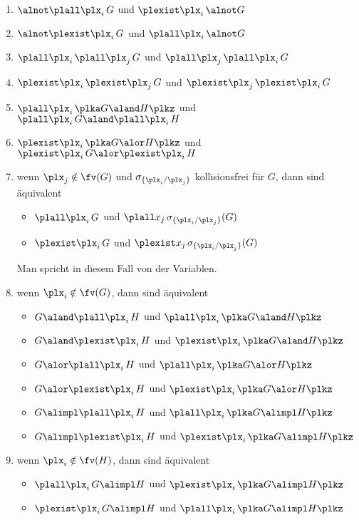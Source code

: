 \begin{enumerate}
\item $\alnot\plall\plx_i \,G$ und $\plexist\plx_i \,\alnot G$
\item $\alnot\plexist\plx_i \,G$ und $\plall\plx_i \,\alnot G$
\item $\plall\plx_i\,\plall\plx_j \,G$ und  $\plall\plx_j\,\plall\plx_i \,G$ 
\item $\plexist\plx_i\,\plexist\plx_j \,G$ und $\plexist\plx_j\,\plexist\plx_i \,G$
\item $\plall\plx_i\,\plka G \aland H\plkz$ und  $\plall\plx_i\, G \aland \plall\plx_i\,H$
\item $\plexist\plx_i\,\plka G \alor H\plkz$ und  $\plexist\plx_i\, G \alor \plexist\plx_i\,H$
\item wenn $\plx_j\notin\fv(G)$ und $\sigma_{\{\plx_i/\plx_j\}}$
  kollisionsfrei für $G$, dann sind äquivalent
  \begin{itemize}
  \item $\plall\plx_i \,G$ und $\plall x_j \, \sigma_{\{\plx_i/\plx_j\}}(G)$
  \item $\plexist\plx_i \,G$ und $\plexist x_j \, \sigma_{\{\plx_i/\plx_j\}}(G)$
  \end{itemize}
  Man spricht in diesem Fall von  der Variablen.
\item wenn $\plx_i\notin\fv(G)$, dann sind äquivalent
  \begin{itemize}
  \item $G\aland \plall \plx_i \, H$ und $\plall \plx_i \, \plka G\aland H\plkz$ 
  \item $G\aland \plexist \plx_i \, H$ und $\plexist \plx_i \, \plka G\aland H\plkz$ 
  \item $G\alor \plall \plx_i \, H$ und $\plall \plx_i \, \plka G\alor H\plkz$ 
  \item $G\alor \plexist \plx_i \, H$ und $\plexist \plx_i \, \plka G\alor H\plkz$ 
  \item $G\alimpl \plall \plx_i \, H$ und $\plall \plx_i \, \plka G\alimpl H\plkz$ 
  \item $G\alimpl \plexist \plx_i \, H$ und $\plexist \plx_i \, \plka G\alimpl H\plkz$ 
  \end{itemize}
\item wenn $\plx_i\notin\fv(H)$, dann sind äquivalent
  \begin{itemize}
  \item $\plall\plx_i \,G \alimpl H$ und $\plexist\plx_i\, \plka G\alimpl H\plkz$
  \item $\plexist\plx_i \,G \alimpl H$ und $\plall\plx_i\, \plka G\alimpl H\plkz$
  \end{itemize}
\end{enumerate}
